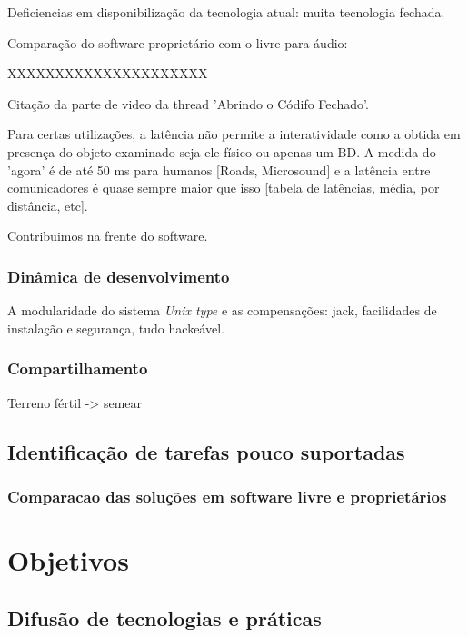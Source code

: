 Deficiencias em disponibilização da tecnologia atual: muita
tecnologia fechada.

Comparação do software proprietário com o livre para áudio:

XXXXXXXXXXXXXXXXXXXXX

Citação da parte de video da thread 'Abrindo o Códifo Fechado'.

Para certas utilizações, a latência não permite a interatividade como 
a obtida em presença do objeto examinado seja ele físico ou apenas um BD.
A medida do 'agora' é de até 50 ms para humanos [Roads, Microsound] e a latência entre comunicadores é
quase sempre maior que isso [tabela de latências, média, por distância, etc].

Contribuimos na frente do software.


\subsubsection{Dinâmica de desenvolvimento}
\label{sec:din_dev}

A modularidade do sistema \emph{Unix type} e as compensações: jack,
facilidades de instalação e segurança, tudo hackeável.

\subsubsection{Compartilhamento}
\label{sec:comp_tec}

Terreno fértil -> semear

\subsection{Identificação de tarefas pouco suportadas}
\label{sec:tarefas_n_sup}

\subsubsection{Comparacao das soluções em software livre e proprietários}
\label{sec:sl_prop}


\section{Objetivos}
\label{sec:objetivos}


\subsection{Difusão de tecnologias e práticas}
\label{sec:tutoriais}

